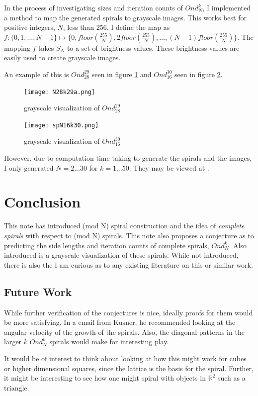 \documentclass[11pt]{amsart}
\theoremstyle{mydef}
\begin{document}
In the process of investigating sizes and iteration counts of $Ond^k_N$, I implemented a method to map the generated spirals to grayscale images. This works best for positive integers, $N$, less than 256. I define the map as $f : \{ 0, 1, \ldots, N-1 \} \mapsto \{ 0, floor(\frac{255}{N}), 2floor(\frac{255}{N}), \ldots, (N-1)floor(\frac{255}{N}) \}$. The mapping $f$ takes $S_N$ to a set of brightness values. These brightness values are easily used to create grayscale images.

An example of this is $Ond^{29}_{28}$ seen in figure \ref{fig:viz2928} and $Ond^{30}_{16}$ seen in figure \ref{fig:viz1630}.

\begin{figure}[h]
\centering
\texttt{[image: N28k29a.png]}
\caption{grayscale visualization of $Ond^{29}_{28}$}
\label{fig:viz2928}
\end{figure}

\begin{figure}
\centering
\texttt{[image: spN16k30.png]}
\caption{grayscale visualization of $Ond^{30}_{16}$}
\label{fig:viz1630}
\end{figure}

However, due to computation time taking to generate the spirals and the images, I only generated $N=2...30$ for $k=1...50$. They may be viewed at \cite{GraySquare}.

\section{Conclusion}
This note has introduced (mod N) spiral construction and the idea of \textit{complete spirals} with respect to (mod N) spirals. This note also proposes a conjecture as to predicting the side lengths and iteration counts of complete spirals, $Ond^k_N$. Also introduced is a grayscale visualization of these spirals. While not introduced, there is also the I am curious as to any existing literature on this or similar work.

\subsection{Future Work}
While further verification of the conjectures is nice, ideally proofs for them would be more satisfying. In a email from Kusner, he recommended looking at the angular velocity of the growth  of the spirals. Also, the diagonal patterns in the larger $k$ $Ond^k_N$ spirals would make for interesting play.

It would be of interest to think about looking at how this might work for cubes or higher dimensional squares, since the lattice is the basis for the spiral. Further, it might be interesting to see how one might spiral with objects in $\mathbb{R}^2$ such as a triangle.
\end{document}
